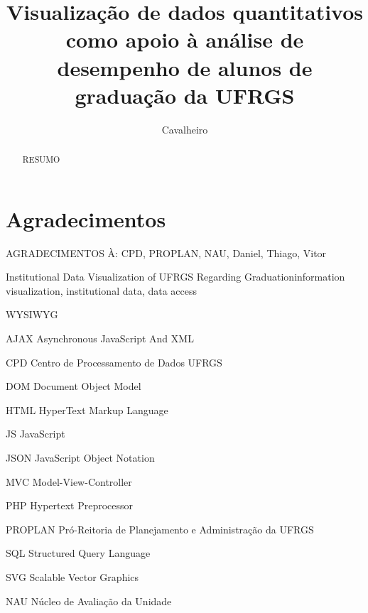 \documentclass[cic,tc]{iiufrgs}
\title{Visualização de dados quantitativos como apoio à análise de desempenho de alunos de graduação da UFRGS}
\author{Cavalheiro}{Daniela Mendonça}
\begin{document}
\maketitle

\chapter*{Agradecimentos}
AGRADECIMENTOS À: CPD, PROPLAN, NAU, Daniel, Thiago, Vitor


\begin{abstract}
    RESUMO
\end{abstract}

\begin{englishabstract}{Institutional Data Visualization of UFRGS Regarding Graduation}{information visualization, institutional data, data access}

\end{englishabstract}

\listoffigures

\listoftables

\begin{listofabbrv}{WYSIWYG} %
    \item[AJAX] Asynchronous JavaScript And XML
    \item[CPD] Centro de Processamento de Dados UFRGS
    \item[DOM] Document Object Model
    \item[HTML] HyperText Markup Language
    \item[JS] JavaScript
    \item[JSON] JavaScript Object Notation
    \item[MVC] Model-View-Controller
    \item[PHP] Hypertext Preprocessor
    \item[PROPLAN] Pró-Reitoria de Planejamento e Administração da UFRGS 
    \item[SQL] Structured Query Language
    \item[SVG] Scalable Vector Graphics
    \item[NAU] Núcleo de Avaliação da Unidade
    
\end{listofabbrv}
\end{document}
